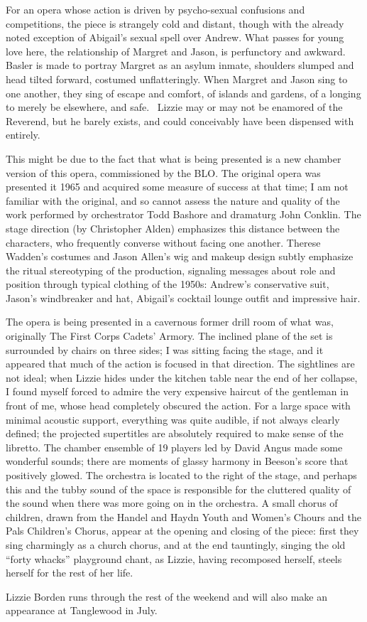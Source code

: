 For an opera whose action is driven by psycho-sexual confusions and competitions, the piece is strangely cold and distant, though with the already noted exception of Abigail’s sexual spell over Andrew. What passes for young love here, the relationship of Margret and Jason, is perfunctory and awkward. Basler is made to portray Margret as an asylum inmate, shoulders slumped and head tilted forward, costumed unflatteringly. When Margret and Jason sing to one another, they sing of escape and comfort, of islands and gardens, of a longing to merely be elsewhere, and safe.  Lizzie may or may not be enamored of the Reverend, but he barely exists, and could conceivably have been dispensed with entirely.

This might be due to the fact that what is being presented is a new chamber version of this opera, commissioned by the BLO. The original opera was presented it 1965 and acquired some measure of success at that time; I am not familiar with the original, and so cannot assess the nature and quality of the work performed by orchestrator Todd Bashore and dramaturg John Conklin. The stage direction (by Christopher Alden) emphasizes this distance between the characters, who frequently converse without facing one another. Therese Wadden’s costumes and Jason Allen’s wig and makeup design subtly emphasize the ritual stereotyping of the production, signaling messages about role and position through typical clothing of the 1950s: Andrew’s conservative suit, Jason’s windbreaker and hat, Abigail’s cocktail lounge outfit and impressive hair.

The opera is being presented in a cavernous former drill room of what was, originally The First Corps Cadets’ Armory. The inclined plane of the set is surrounded by chairs on three sides; I was sitting facing the stage, and it appeared that much of the action is focused in that direction. The sightlines are not ideal; when Lizzie hides under the kitchen table near the end of her collapse, I found myself forced to admire the very expensive haircut of the gentleman in front of me, whose head completely obscured the action. For a large space with minimal acoustic support, everything was quite audible, if not always clearly defined; the projected supertitles are absolutely required to make sense of the libretto. The chamber ensemble of 19 players led by David Angus made some wonderful sounds; there are moments of glassy harmony in Beeson’s score that positively glowed. The orchestra is located to the right of the stage, and perhaps this and the tubby sound of the space is responsible for the cluttered quality of the sound when there was more going on in the orchestra. A small chorus of children, drawn from the Handel and Haydn Youth and Women’s Chours and the Pals Children’s Chorus, appear at the opening and closing of the piece: first they sing charmingly as a church chorus, and at the end tauntingly, singing the old “forty whacks” playground chant, as Lizzie, having recomposed herself, steels herself for the rest of her life.

Lizzie Borden runs through the rest of the weekend and will also make an appearance at Tanglewood in July.

